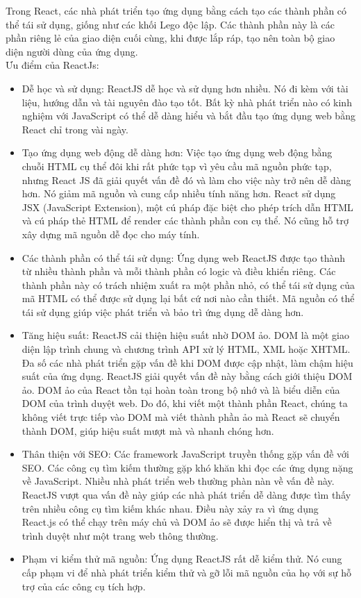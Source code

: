         Trong React, các nhà phát triển tạo ứng dụng bằng cách tạo các thành phần có thể tái sử dụng, giống như các khối Lego độc lập. Các thành phần này là các phần riêng lẻ của giao diện cuối cùng, khi được lắp ráp, tạo nên toàn bộ giao diện người dùng của ứng dụng.\\
        Ưu điểm của ReactJs: 
            \begin{itemize}
                \item Dễ học và sử dụng: ReactJS dễ học và sử dụng hơn nhiều. Nó đi kèm với tài liệu, hướng dẫn và tài nguyên đào tạo tốt. Bất kỳ nhà phát triển nào có kinh nghiệm với JavaScript có thể dễ dàng hiểu và bắt đầu tạo ứng dụng web bằng React chỉ trong vài ngày.
                \item Tạo ứng dụng web động dễ dàng hơn: Việc tạo ứng dụng web động bằng chuỗi HTML cụ thể đôi khi rất phức tạp vì yêu cầu mã nguồn phức tạp, nhưng React JS đã giải quyết vấn đề đó và làm cho việc này trở nên dễ dàng hơn. Nó giảm mã nguồn và cung cấp nhiều tính năng hơn. React sử dụng JSX (JavaScript Extension), một cú pháp đặc biệt cho phép trích dẫn HTML và cú pháp thẻ HTML để render các thành phần con cụ thể. Nó cũng hỗ trợ xây dựng mã nguồn dễ đọc cho máy tính.
                \item Các thành phần có thể tái sử dụng: Ứng dụng web ReactJS được tạo thành từ nhiều thành phần và mỗi thành phần có logic và điều khiển riêng. Các thành phần này có trách nhiệm xuất ra một phần nhỏ, có thể tái sử dụng của mã HTML có thể được sử dụng lại bất cứ nơi nào cần thiết. Mã nguồn có thể tái sử dụng giúp việc phát triển và bảo trì ứng dụng dễ dàng hơn.
                \item Tăng hiệu suất: ReactJS cải thiện hiệu suất nhờ DOM ảo. DOM là một giao diện lập trình chung và chương trình API xử lý HTML, XML hoặc XHTML. Đa số các nhà phát triển gặp vấn đề khi DOM được cập nhật, làm chậm hiệu suất của ứng dụng. ReactJS giải quyết vấn đề này bằng cách giới thiệu DOM ảo. DOM ảo của React tồn tại hoàn toàn trong bộ nhớ và là biểu diễn của DOM của trình duyệt web. Do đó, khi viết một thành phần React, chúng ta không viết trực tiếp vào DOM mà viết thành phần ảo mà React sẽ chuyển thành DOM, giúp hiệu suất mượt mà và nhanh chóng hơn.
                \item Thân thiện với SEO: Các framework JavaScript truyền thống gặp vấn đề với SEO. Các công cụ tìm kiếm thường gặp khó khăn khi đọc các ứng dụng nặng về JavaScript. Nhiều nhà phát triển web thường phàn nàn về vấn đề này. ReactJS vượt qua vấn đề này giúp các nhà phát triển dễ dàng được tìm thấy trên nhiều công cụ tìm kiếm khác nhau. Điều này xảy ra vì ứng dụng React.js có thể chạy trên máy chủ và DOM ảo sẽ được hiển thị và trả về trình duyệt như một trang web thông thường.
                \item Phạm vi kiểm thử mã nguồn: Ứng dụng ReactJS rất dễ kiểm thử. Nó cung cấp phạm vi để nhà phát triển kiểm thử và gỡ lỗi mã nguồn của họ với sự hỗ trợ của các công cụ tích hợp.
            \end{itemize}
